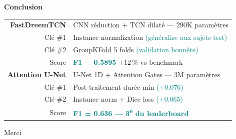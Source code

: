 \documentclass[aspectratio=169, 10pt]{beamer}
\begin{document}
{
\begin{frame}[standout]
    \color{white}\centering
    \large\textbf{Conclusion}\normalsize\\[0.8em]
    \begin{tabular}{@{}r@{\quad}l@{}}
        \textbf{FastDreemTCN} & CNN réduction + TCN dilaté --- 290K paramètres \\[3pt]
        Clé \#1  & Instance normalization \textcolor{Teal}{(généralise aux sujets test)} \\[3pt]
        Clé \#2  & GroupKFold 5 folds \textcolor{Teal}{(validation honnête)} \\[3pt]
        Score    & \textcolor{Teal}{\textbf{F1 = 0.5895}} \quad $+12\,\%$ vs benchmark \\[10pt]
        \textbf{Attention U-Net} & U-Net 1D + Attention Gates --- 3M paramètres \\[3pt]
        Clé \#1  & Post-traitement durée min \textcolor{Teal}{(+0.076)} \\[3pt]
        Clé \#2  & Instance norm + Dice loss \textcolor{Teal}{(+0.065)} \\[3pt]
        Score    & \textcolor{Teal}{\textbf{F1 = 0.636 --- 3\textsuperscript{e} du leaderboard}}
    \end{tabular}
    \vspace{0.5em}
    \textcolor{MidGray}{\small Merci}
\end{frame}
}
\end{document}
